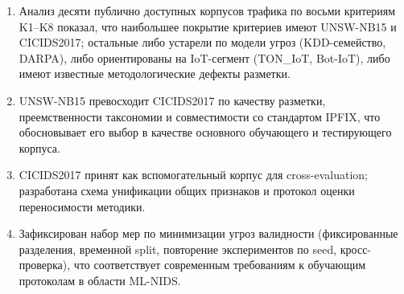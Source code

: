\begin{enumerate}
    \item Анализ десяти публично доступных корпусов трафика по восьми
    критериям K1--K8 показал, что наибольшее покрытие критериев имеют
    UNSW-NB15 и CICIDS2017; остальные либо устарели по модели угроз
    (KDD-семейство, DARPA), либо ориентированы на IoT-сегмент
    (TON\_IoT, Bot-IoT), либо имеют известные методологические дефекты
    разметки.
    \item UNSW-NB15 превосходит CICIDS2017 по качеству разметки,
    преемственности таксономии и совместимости со стандартом IPFIX,
    что обосновывает его выбор в качестве основного обучающего и тестирующего
    корпуса.
    \item CICIDS2017 принят как вспомогательный корпус для cross-evaluation;
    разработана схема унификации общих признаков и протокол оценки переносимости
    методики.
    \item Зафиксирован набор мер по минимизации угроз валидности
    (фиксированные разделения, временной split, повторение экспериментов
    по seed, кросс-проверка), что соответствует современным требованиям к
    обучающим протоколам в области ML-NIDS.
\end{enumerate}
